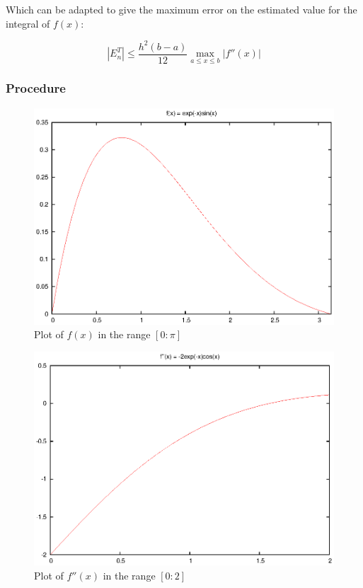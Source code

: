\documentclass[pdf,color]{UoBnote}
\begin{document}
			Which can be adapted to give the maximum error on the estimated value for the integral of $f(x)$:
			
			\begin{equation} \label{eq:trap_err2}
				\left|E_n^T\right| \leq \frac{h^2\left(b-a\right)}{12}\max_{a \leq x \leq b}\left|f''(x)\right|
			\end{equation}
			
			\subsubsection{Procedure}
				
				\begin{figure}[tb]
					\centering
						\includegraphics{figures/q2b.eps}
					\caption{Plot of $f(x)$ in the range $[0:\pi]$}
					\label{fig:q2b}
				\end{figure}
				
				
				\begin{figure}[tb]
					\centering
						\includegraphics{figures/q2-f2x-trap.eps}
					\caption{Plot of $f''(x)$ in the range $[0:2]$}
					\label{fig:q2-f2x-trap}
				\end{figure}
				
\end{document}
